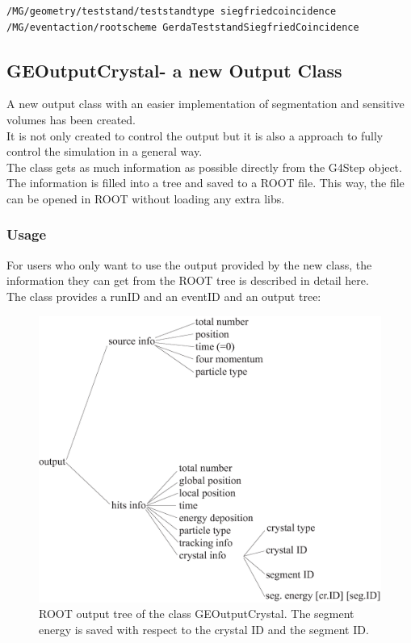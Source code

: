 \begin{lstlisting}
/MG/geometry/teststand/teststandtype siegfriedcoincidence
/MG/eventaction/rootscheme GerdaTeststandSiegfriedCoincidence
\end{lstlisting}

\subsection{GEOutputCrystal- a new Output Class} 

A new output class with an easier implementation of segmentation and sensitive volumes has been created.\\
It is not only created to control the output but it is also a approach to fully control the simulation in a general way.\\
The class gets as much information as possible directly from the G4Step object. The information is filled into a tree and saved to a ROOT file. This way, the file can be opened in ROOT without loading any extra libs.\\
\subsubsection{Usage}
For users who only want to use the output provided by the new class, the information they can get from the ROOT tree is described in detail here.\\
The class provides a runID and an eventID and an output tree:\\
\begin{figure}[h!]
\begin{center} 
\includegraphics[scale=0.7]{figures/outputtree_big}
\caption{\small ROOT output tree of the class GEOutputCrystal. The segment energy is saved with respect to the crystal ID and the segment ID.}
\end{center}
\end{figure}

